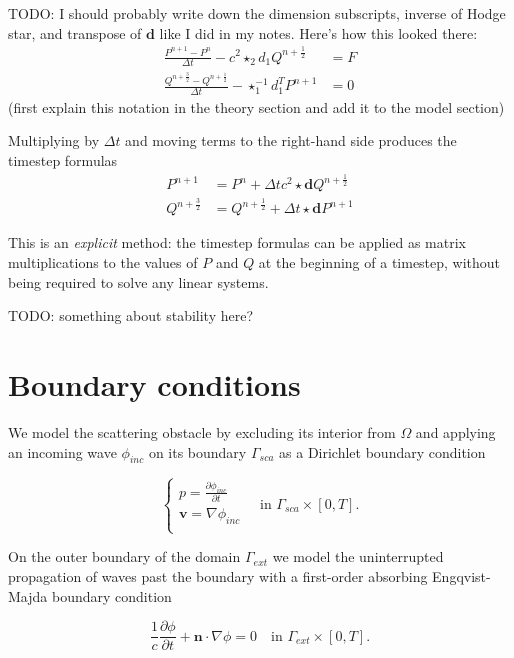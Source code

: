 \documentclass[utf8,english]{gradu3}
\begin{document}
TODO: I should probably write down the dimension subscripts,
inverse of Hodge star, and transpose of $\mathbf{d}$ like I did in my notes.
Here's how this looked there:
\begin{align*}
  \frac{P^{n+1} - P^n}{\Delta t} - c^2 \star_2 d_1 Q^{n+\frac{1}{2}} &= F \\
  \frac{Q^{n+\frac{3}{2}} - Q^{n+\frac{1}{2}}}{\Delta t}
  - \star_1^{-1} d_1^T P^{n+1} &= 0
\end{align*}
(first explain this notation in the theory section
and add it to the model section)

Multiplying by $\Delta t$ and moving terms to the right-hand side
produces the timestep formulas
\begin{align}
  P^{n+1} &= P^n + \Delta t c^2 \star \mathbf{d} Q^{n+\frac{1}{2}} \\
  Q^{n+\frac{3}{2}} &= Q^{n+\frac{1}{2}} + \Delta t \star \mathbf{d} P^{n+1}
\end{align}

This is an \textit{explicit} method:
the timestep formulas can be applied as matrix multiplications
to the values of $P$ and $Q$ at the beginning of a timestep,
without being required to solve any linear systems.

TODO: something about stability here?

\section{Boundary conditions}\label{sec:boundary_conditions}

We model the scattering obstacle by excluding its interior from $\Omega$
and applying an incoming wave $\phi_{inc}$ on its boundary $\Gamma_{sca}$
as a Dirichlet boundary condition

\[
  \begin{cases}
    p = \frac{\partial \phi_{inc}}{\partial t} \\
    \mathbf{v} = \nabla \phi_{inc} \\
  \end{cases}
  \quad \text{in } \Gamma_{sca} \times [0, T].
\]

On the outer boundary of the domain $\Gamma_{ext}$
we model the uninterrupted propagation of waves past the boundary
with a first-order absorbing Engqvist-Majda boundary condition
\parencite{engquist_absorbing_1977}

\[
  \frac{1}{c}\frac{\partial\phi}{\partial t} + \mathbf{n} \cdot \nabla\phi = 0
  \quad \text{in } \Gamma_{ext} \times [0, T].
\]
\end{document}
